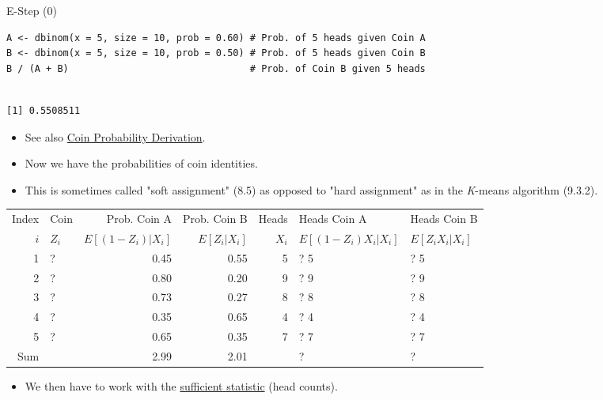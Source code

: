 \documentclass[dvipdfmx,bigger,aspectratio=169]{beamer}
\begin{document}
\begin{frame}[fragile,allowframebreaks,label=,t]{E-Step (0)}
\scriptsize
\begin{verbatim}
A <- dbinom(x = 5, size = 10, prob = 0.60) # Prob. of 5 heads given Coin A
B <- dbinom(x = 5, size = 10, prob = 0.50) # Prob. of 5 heads given Coin B
B / (A + B)                                # Prob. of Coin B given 5 heads
\end{verbatim}

\begin{verbatim}

[1] 0.5508511
\end{verbatim}


\normalsize
\begin{itemize}
\item See also \hyperlink{sec:org29e1198}{Coin Probability Derivation}.
\end{itemize}

\newpage
\begin{itemize}
\item Now we have the probabilities of coin identities.
\item This is sometimes called "soft assignment" \cite{hastieElementsStatisticalLearning2016} (8.5) as opposed to "hard assignment" as in the \emph{K}-means algorithm \cite{bishopPatternRecognitionMachine2006} (9.3.2).
\end{itemize}
\footnotesize
\begin{center}
\begin{tabular}{r|l|rr|r|ll|}
Index & Coin & Prob. Coin A & Prob. Coin B & Heads & Heads Coin A & Heads Coin B\\
\(i\) & \(Z_{i}\) & \(E[(1-Z_{i})\vert X_{i}]\) & \(E[Z_{i}\vert X_{i}]\) & \(X_{i}\) & \(E[(1-Z_{i}) X_{i} \vert X_{i}]\) & \(E[Z_{i} X_{i} \vert X_{i}]\)\\
\hline
1 & ? & 0.45 & 0.55 & 5 & ? \texttimes{} 5 & ? \texttimes{} 5\\
2 & ? & 0.80 & 0.20 & 9 & ? \texttimes{} 9 & ? \texttimes{} 9\\
3 & ? & 0.73 & 0.27 & 8 & ? \texttimes{} 8 & ? \texttimes{} 8\\
4 & ? & 0.35 & 0.65 & 4 & ? \texttimes{} 4 & ? \texttimes{} 4\\
5 & ? & 0.65 & 0.35 & 7 & ? \texttimes{} 7 & ? \texttimes{} 7\\
\hline
Sum &  & 2.99 & 2.01 &  & ? & ?\\
\end{tabular}
\end{center}
\normalsize
\begin{itemize}
\item We then have to work with the \href{https://www.statisticshowto.datasciencecentral.com/sufficient-statistic/}{sufficient statistic} (head counts).
\end{itemize}


\end{frame}
\end{document}
